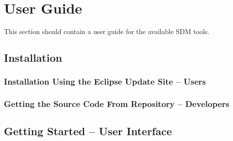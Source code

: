 \chapter{User Guide}\label{sec:UserGuide}
	
This section should contain a user guide for the available SDM tools.


\section{Installation}


\subsection{Installation Using the Eclipse Update Site -- Users}


\subsection{Getting the Source Code From Repository -- Developers}


\section{Getting Started -- User Interface}